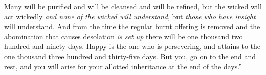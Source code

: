 \begin{biblechapter}
\verse Many will be purified and will be cleansed and will be refined, but the wicked will act wickedly \textit{and none of the wicked will understand}, but \textit{those who have insight} will understand.
\verse And from the time the regular burnt offering is removed and the abomination that causes desolation \textit{is set up} there will be one thousand two hundred and ninety days.
\verse Happy is the one who is persevering, and attains to the one thousand three hundred and thirty-five days.
\verse But you, go on to the end and rest, and you will arise for your allotted inheritance at the end of the days.”
\end{biblechapter}

